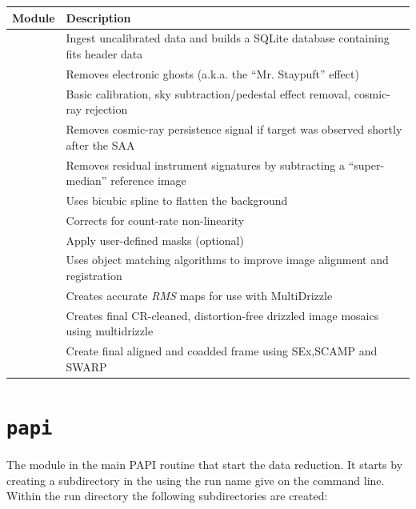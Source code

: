 \documentclass[letterpaper,10pt,english]{sphinxmanual}
\begin{document}
\begin{tabulary}{\linewidth}{|r|l|}
\hline
\textbf{
Module
} & \textbf{
Description
}\\\hline

 & 
Ingest uncalibrated data and builds a SQLite database containing fits header data
\\\hline

 & 
Removes electronic ghosts (a.k.a. the ``Mr. Staypuft'' effect)
\\\hline

 & 
Basic calibration, sky subtraction/pedestal effect removal, cosmic-ray rejection
\\\hline

 & 
Removes cosmic-ray persistence signal if target was observed shortly after the SAA
\\\hline

 & 
Removes residual instrument signatures by subtracting a ``super-median'' reference image
\\\hline

 & 
Uses bicubic spline to flatten the background
\\\hline

 & 
Corrects for count-rate non-linearity
\\\hline

 & 
Apply user-defined masks (optional)
\\\hline

 & 
Uses object matching algorithms to improve image alignment and registration
\\\hline

 & 
Creates accurate \emph{RMS} maps for use with MultiDrizzle
\\\hline

 & 
Creates final CR-cleaned, distortion-free drizzled image mosaics using multidrizzle
\\\hline

 & 
Create final aligned and coadded frame using SEx,SCAMP and SWARP
\\\hline
\end{tabulary}



\section{\texttt{papi}}
\label{modules:papi}\label{modules:index-1}
The  module in the main PAPI routine that start the data reduction.
It starts by creating a subdirectory in the  using the run name
give on the command line.  Within the run directory the following
subdirectories are created:
\end{document}
